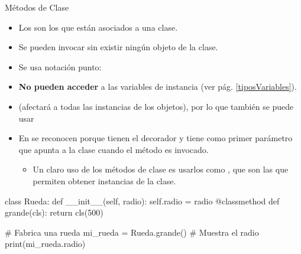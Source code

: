 \documentclass[10pt,envcountsect,spanish]{beamer}
\begin{document}
\begin{frame}[fragile, label={metodoClase}]{Métodos de Clase} 

\begin{itemize}
\item Los  son los que están asociados a una clase.
\item Se pueden invocar sin existir ningún objeto de la clase.
\item Se usa notación punto: 
\item \textbf{No pueden acceder} a las variables de instancia (ver pág. \ref{tiposVariables}).
\item {} (afectará a todas las instancias de los objetos), por lo que también se puede usar 
\item En  se reconocen porque tienen el decorador  y tiene como primer parámetro  que apunta a la clase cuando el método es invocado.


\begin{itemize}
\item Un claro uso de los métodos de clase es usarlos como , que son las que permiten obtener instancias de la clase.
\end{itemize}

\end{itemize}

\unEjemplo 

\footnotesize
\begin{minipage}{.48\textwidth}
\begin{pyconsole}[][frame=single]
class Rueda:
    def __init__(self, radio):
        self.radio = radio
    @classmethod 
    def grande(cls): 
        return cls(500)

\end{pyconsole}
\end{minipage}
\begin{minipage}{.46\textwidth}
\begin{pyconsole}[][frame=single]
# Fabrica una rueda
mi_rueda = Rueda.grande()
# Muestra el radio
print(mi_rueda.radio)
\end{pyconsole}
\end{minipage}
\end{frame}
\end{document}

